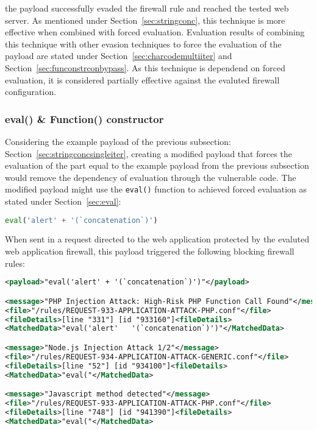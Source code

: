 the payload successfully evaded the firewall rule and reached the tested web server. As mentioned under Section~\ref{sec:stringconc}, this technique is more effective when combined with forced evaluation. Evaluation results of combining this technique with other evasion techniques to force the evaluation of the payload are stated under Section~\ref{sec:charcodemultiiter} and Section~\ref{sec:funconstrconbypass}. As this technique is dependend on forced evaluation, it is considered partially effective against the evaluted firewall configuration.


\subsubsection{eval() \& Function() constructor}
\label{sec:functionconstructorsingleeva}
Considering the example payload of the previous subsection: Section~\ref{sec:stringconcsingleiter}, creating a modified payload that forces the evaluation of the part equal to the example payload from the previous subsection would remove the dependency of evaluation through the vulnerable code. The modified payload might use the \verb|eval()| function to achieved forced evaluation as stated under Section~\ref{sec:eval}:

\begin{lstlisting}[style=basicStyle, language=Python]
eval('alert' + '(`concatenation`)')
\end{lstlisting}

When sent in a request directed to the web application protected by the evaluted web application firewall, this payload triggered the following blocking firewall rules:

\begin{lstlisting}[style=ruleStyle, language=XML, caption=eval() blocked, label={lst:evalblocked}]
<payload>"eval('alert' + '(`concatenation`)')"</payload>

<message>"PHP Injection Attack: High-Risk PHP Function Call Found"</message>
<file>"/rules/REQUEST-933-APPLICATION-ATTACK-PHP.conf"</file>
<fileDetails>[line "331"] [id "933160"]<fileDetails>
<MatchedData>"eval('alert'   '(`concatenation`)')"</MatchedData>

<message>"Node.js Injection Attack 1/2"</message>
<file>"/rules/REQUEST-934-APPLICATION-ATTACK-GENERIC.conf"</file>
<fileDetails>[line "52"] [id "934100"]<fileDetails>
<MatchedData>"eval("</MatchedData>

<message>"Javascript method detected"</message>
<file>"/rules/REQUEST-933-APPLICATION-ATTACK-PHP.conf"</file>
<fileDetails>[line "748"] [id "941390"]<fileDetails>
<MatchedData>"eval("</MatchedData>
\end{lstlisting}

